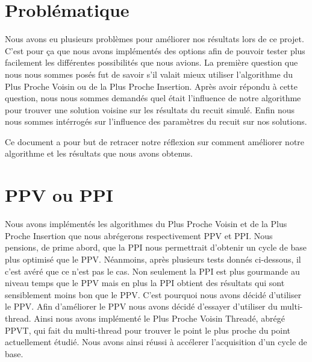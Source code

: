 \documentclass{article}
\begin{document}



\section{Problématique}

Nous avons eu plusieurs problèmes pour améliorer nos résultats lors de ce projet.
C'est pour ça que nous avons implémentés des options afin de pouvoir tester plus facilement les différentes possibilités que nous avions.
La première question que nous nous sommes posés fut de savoir s'il valait mieux utiliser l'algorithme du Plus Proche Voisin ou de la Plus Proche Insertion.
Après avoir répondu à cette question, nous nous sommes demandés quel était l'influence de notre algorithme pour trouver une solution voisine sur les résultats du recuit simulé.
Enfin nous nous sommes intérrogés sur l'influence des paramètres du recuit sur nos solutions.

Ce document a pour but de retracer notre réflexion sur comment améliorer notre algorithme et les résultats que nous avons obtenus.

\section{PPV ou PPI}

Nous avons implémentés les algorithmes du Plus Proche Voisin et de la Plus Proche Insertion que nous abrégerons respectivement PPV et PPI.
Nous pensions, de prime abord, que la PPI nous permettrait d'obtenir un cycle de base plus optimisé que le PPV.
Néanmoins, après plusieurs tests donnés ci-dessous, il c'est avéré que ce n'est pas le cas.
Non seulement la PPI est plus gourmande au niveau temps que le PPV mais en plus la PPI obtient des résultats qui sont sensiblement moins bon que le PPV. C'est pourquoi nous avons décidé d'utiliser le PPV.
Afin d'améliorer le PPV nous avons décidé d'essayer d'utiliser du multi-thread.
Ainsi nous avons implémenté le Plus Proche Voisin Threadé, abrégé PPVT, qui fait du multi-thread pour trouver le point le plus proche du point actuellement étudié.
Nous avons ainsi réussi à accélerer l'acquisition d'un cycle de base.
\end{document}
